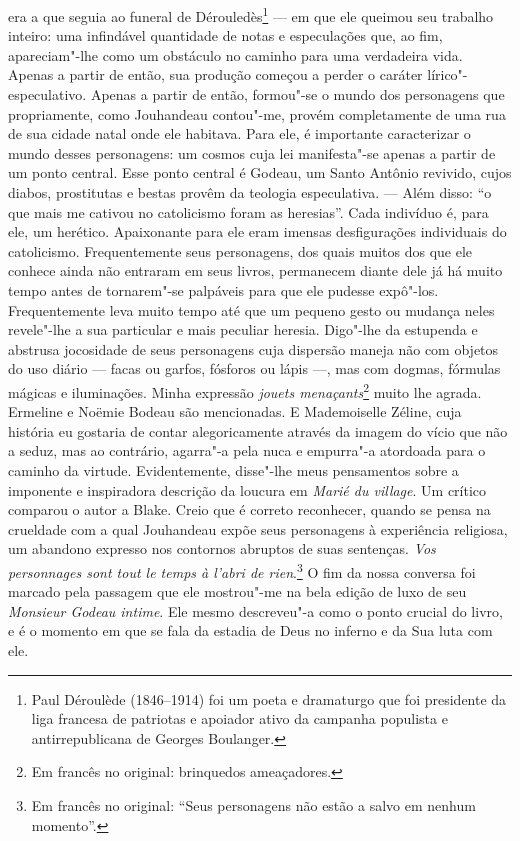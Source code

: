 era a que seguia ao funeral de Dérouledès\footnote{Paul Déroulède
  (1846--1914) foi um poeta e dramaturgo que foi presidente da liga
  francesa de patriotas e apoiador ativo da campanha populista e
  antirrepublicana de Georges Boulanger. \versal{[N.~O.]}} --- em que ele queimou seu
trabalho inteiro: uma infindável quantidade de notas e especulações que,
ao fim, apareciam"-lhe como um obstáculo no caminho para uma verdadeira
vida. Apenas a partir de então, sua produção começou a perder o caráter
lírico"-especulativo. Apenas a partir de então, formou"-se o mundo dos
personagens que propriamente, como Jouhandeau contou"-me, provém
completamente de uma rua de sua cidade natal onde ele habitava. Para
ele, é importante caracterizar o mundo desses personagens: um cosmos
cuja lei manifesta"-se apenas a partir de um ponto central. Esse ponto
central é Godeau, um Santo Antônio revivido, cujos diabos, prostitutas e
bestas provêm da teologia especulativa. --- Além disso: ``o que mais me
cativou no catolicismo foram as heresias''. Cada indivíduo é, para ele,
um herético. Apaixonante para ele eram imensas desfigurações individuais
do catolicismo. Frequentemente seus personagens, dos quais muitos dos
que ele conhece ainda não entraram em seus livros, permanecem diante
dele já há muito tempo antes de tornarem"-se palpáveis para que ele
pudesse expô"-los. Frequentemente leva muito tempo até que um pequeno
gesto ou mudança neles revele"-lhe a sua particular e mais peculiar
heresia. Digo"-lhe da estupenda e abstrusa jocosidade de seus personagens
cuja dispersão maneja não com objetos do uso diário --- facas ou garfos,
fósforos ou lápis ---, mas com dogmas, fórmulas mágicas e iluminações.
Minha expressão \emph{jouets menaçants}\footnote{Em francês no original: brinquedos
  ameaçadores. \versal{[N.~T.]}} muito lhe agrada. Ermeline e
Noëmie Bodeau são mencionadas. E Mademoiselle Zéline, cuja história eu
gostaria de contar alegoricamente através da imagem do vício que não a
seduz, mas ao contrário, agarra"-a pela nuca e empurra"-a atordoada para o
caminho da virtude. Evidentemente, disse"-lhe meus pensamentos sobre a
imponente e inspiradora descrição da loucura em \emph{Marié du village}.
Um crítico comparou o autor a Blake. Creio que é correto reconhecer,
quando se pensa na crueldade com a qual Jouhandeau expõe seus
personagens à experiência religiosa, um abandono expresso nos contornos
abruptos de suas sentenças. \emph{Vos personnages sont tout le temps à
l'abri de rien}.\footnote{Em francês no original: ``Seus personagens não estão a salvo em
  nenhum momento''. \versal{[N.~T.]}} O fim da nossa conversa
foi marcado pela passagem que ele mostrou"-me na bela edição de luxo de
seu \emph{Monsieur Godeau intime}. Ele mesmo descreveu"-a como o ponto
crucial do livro, e é o momento em que se fala da estadia de Deus no
inferno e da Sua luta com ele.

